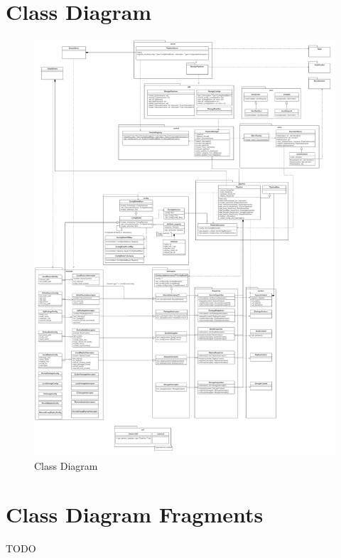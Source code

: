   \section{Class Diagram}
    \begin{figure}[H]
        \hspace{-4em}
        \includegraphics[width = 1.2\linewidth]{diagrams/architecture_classes.png}
        \caption{Class Diagram}
        \label{fig:architecture_classes}
      \end{figure}

    \section{Class Diagram Fragments}
    TODO


